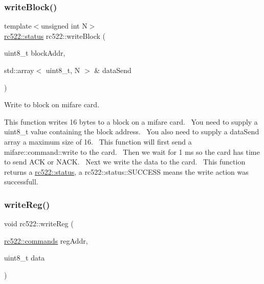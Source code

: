 \subsubsection{\texorpdfstring{write\+Block()}{writeBlock()}}
{\footnotesize\ttfamily template$<$unsigned int N$>$ \\
\hyperlink{classspiReader_a4bcf984823c38cf4841ebf619e788790}{rc522\+::status} rc522\+::write\+Block (\begin{DoxyParamCaption}\item[{uint8\+\_\+t}]{block\+Addr,  }\item[{std\+::array$<$ uint8\+\_\+t, N $>$ \&}]{data\+Send }\end{DoxyParamCaption})\hspace{0.3cm}{\ttfamily [inline]}}



Write to block on mifare card. 

This function writes 16 bytes to a block on a mifare card.~\newline
You need to supply a uint8\+\_\+t value containing the block address.~\newline
You also need to supply a data\+Send array a maximum size of 16.~\newline
This function will first send a mifare\+::command\+::write to the card.~\newline
Then we wait for 1 ms so the card has time to send A\+CK or N\+A\+CK.~\newline
Next we write the data to the card.~\newline
This function returns a \hyperlink{classspiReader_a4bcf984823c38cf4841ebf619e788790}{rc522\+::status}, a rc522\+::status\+::\+S\+U\+C\+C\+E\+SS means the write action was successfull. \mbox{\label{classrc522_a3045ab844b8de82e9a5f3504c82c8995}} 
\subsubsection{\texorpdfstring{write\+Reg()}{writeReg()}\hspace{0.1cm}{\footnotesize\ttfamily [1/6]}}
{\footnotesize\ttfamily void rc522\+::write\+Reg (\begin{DoxyParamCaption}\item[{\hyperlink{classrc522_a6df2359c88d6c2f47faf58bc9e09eaa4}{rc522\+::commands}}]{reg\+Addr,  }\item[{uint8\+\_\+t}]{data }\end{DoxyParamCaption})}



